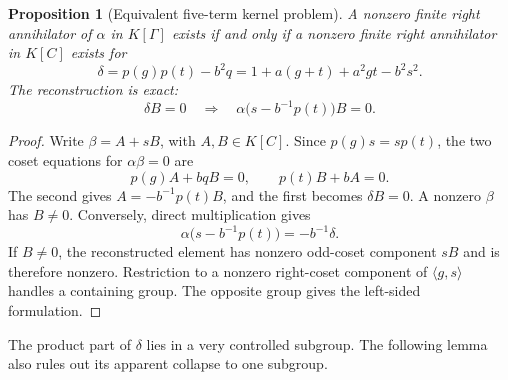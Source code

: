 \documentclass[11pt,a4paper,oneside]{report}
\newtheorem{proposition}[theorem]{Proposition}
\theoremstyle{definition}
\theoremstyle{remark}
\begin{document}
\begin{proposition}[Equivalent five-term kernel problem]
\label{M13:nextinv:schur}
A nonzero finite right annihilator of $\alpha$ in $K[\Gamma]$
exists if and only if a nonzero finite right annihilator in $K[C]$
exists for
\begin{equation}\label{M13:nextinv:delta}
 \delta=p(g)p(t)-b^2q
       =1+a(g+t)+a^2gt-b^2s^2.
\end{equation}
The reconstruction is exact:
\[
 \delta B=0\quad\Longrightarrow\quad
 \alpha\bigl(s-b^{-1}p(t)\bigr)B=0.
\]
\end{proposition}
\begin{proof}
Write $\beta=A+sB$, with $A,B\in K[C]$. Since
$p(g)s=sp(t)$, the two coset equations for $\alpha\beta=0$ are
\[
 p(g)A+bqB=0,\qquad p(t)B+bA=0.
\]
The second gives $A=-b^{-1}p(t)B$, and the first becomes
$\delta B=0$. A nonzero $\beta$ has $B\ne0$.
Conversely, direct multiplication gives
\[
 \alpha\bigl(s-b^{-1}p(t)\bigr)=-b^{-1}\delta.
\]
If $B\ne0$, the reconstructed element has nonzero odd-coset
component $sB$ and is therefore nonzero. Restriction to a nonzero
right-coset component of $\langle g,s\rangle$ handles a containing
group. The opposite group gives the left-sided formulation.
\end{proof}

The product part of $\delta$ lies in a very controlled subgroup.
The following lemma also rules out its apparent collapse to one subgroup.
\end{document}
